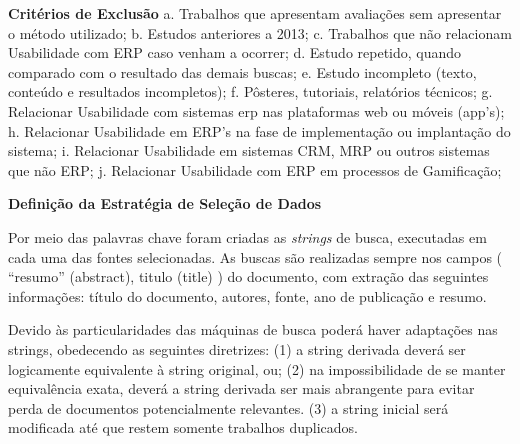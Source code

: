 \noindent \textbf{Critérios de Exclusão}\newline
\newline
\indent a. Trabalhos que apresentam avaliações sem apresentar o método utilizado;\newline 
\indent b. Estudos anteriores a 2013;\newline 
\indent c. Trabalhos que não relacionam Usabilidade com ERP caso venham a ocorrer;\newline 
\indent d. Estudo repetido, quando comparado com o resultado das demais buscas;\newline 
\indent e. Estudo incompleto (texto, conteúdo e resultados incompletos);\newline 
\indent f. Pôsteres, tutoriais, relatórios técnicos;\newline 
\indent g. Relacionar Usabilidade com sistemas erp nas plataformas web ou móveis (app's);\newline 
\indent h. Relacionar Usabilidade em ERP's na fase de implementação ou implantação do sistema;\newline 
\indent i. Relacionar Usabilidade em sistemas CRM, MRP ou outros sistemas que não ERP;\newline
\indent j. Relacionar Usabilidade com ERP em processos de Gamificação;\newline

\noindent \textbf{Definição da Estratégia de Seleção de Dados}\newline

\indent Por meio das palavras chave foram criadas as \textit{strings} de busca, executadas em cada uma das fontes selecionadas. As buscas são realizadas sempre nos campos ( “resumo” (abstract), titulo (title) ) do documento, com extração das seguintes informações: título do documento, autores, fonte, ano de publicação e resumo.\newline

\indent Devido às particularidades das máquinas de busca poderá haver adaptações nas strings, obedecendo as seguintes diretrizes:\newline 
\indent (1) a string derivada deverá ser logicamente equivalente à string original, ou;\newline 
\indent (2) na impossibilidade de se manter equivalência exata, deverá a string derivada ser mais abrangente para evitar perda de documentos potencialmente relevantes.\newline
\indent (3) a string inicial será modificada até que restem somente trabalhos duplicados.\newline

